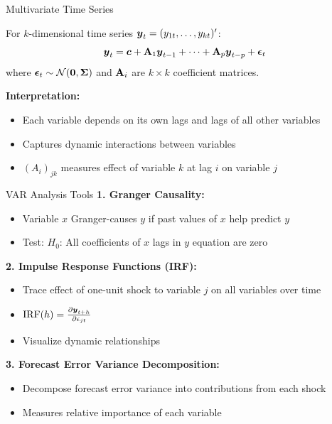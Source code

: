 \documentclass[aspectratio=169]{beamer}
\begin{document}
\begin{frame}{Multivariate Time Series}
  \begin{definitionbox}[title={VAR(p) Model}]
    For $k$-dimensional time series $\boldsymbol{y}_t = (y_{1t}, \ldots, y_{kt})'$:
    \begin{equation}
      \boldsymbol{y}_t = \boldsymbol{c} + \mathbf{A}_1 \boldsymbol{y}_{t-1} + \cdots + \mathbf{A}_p \boldsymbol{y}_{t-p} + \boldsymbol{\epsilon}_t
    \end{equation}
    where $\boldsymbol{\epsilon}_t \sim \mathcal{N}(\boldsymbol{0}, \mathbf{\Sigma})$ and $\mathbf{A}_i$ are $k \times k$ coefficient matrices.
  \end{definitionbox}

  \vspace{0.5em}

  \textbf{Interpretation:}
  \begin{itemize}
    \item Each variable depends on its own lags and lags of all other variables
    \item Captures dynamic interactions between variables
    \item $(A_i)_{jk}$ measures effect of variable $k$ at lag $i$ on variable $j$
  \end{itemize}
\end{frame}

\begin{frame}{VAR Analysis Tools}
  \textbf{1. Granger Causality:}
  \begin{itemize}
    \item Variable $x$ Granger-causes $y$ if past values of $x$ help predict $y$
    \item Test: $H_0$: All coefficients of $x$ lags in $y$ equation are zero
  \end{itemize}

  \vspace{0.5em}

  \textbf{2. Impulse Response Functions (IRF):}
  \begin{itemize}
    \item Trace effect of one-unit shock to variable $j$ on all variables over time
    \item $\text{IRF}(h) = \frac{\partial \boldsymbol{y}_{t+h}}{\partial \epsilon_{jt}}$
    \item Visualize dynamic relationships
  \end{itemize}

  \vspace{0.5em}

  \textbf{3. Forecast Error Variance Decomposition:}
  \begin{itemize}
    \item Decompose forecast error variance into contributions from each shock
    \item Measures relative importance of each variable
  \end{itemize}
\end{frame}
\end{document}

